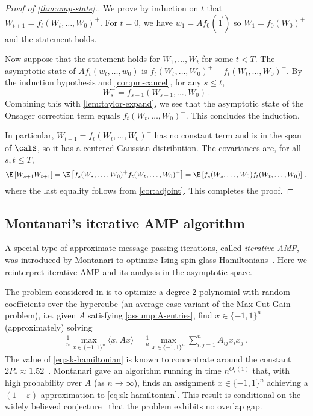 \documentclass[12pt]{article}
\begin{document}
\begin{proof}[Proof of \cref{thm:amp-state}.]
    We prove by induction on $t$ that $W_{t+1}=f_{t}(W_{t},\ldots,W_0)^+$. For $t=0$, we have $w_1 = Af_0(\vec{1})$ so $W_1 = f_0(W_0)^+$ and the statement holds. 
    
    Now suppose that the statement holds for $W_1,\ldots,W_t$ for some $t<T$. The asymptotic state of $A f_t(w_t,\ldots,w_0)$ is $f_t(W_t,\ldots,W_0)^++f_t(W_t,\ldots,W_0)^-$. By the induction hypothesis and \cref{cor:pm-cancel}, for any $s\le t$,
    \[
        W_s^- = f_{s-1}(W_{s-1},\ldots,W_0)\,.
    \]
    Combining this with \cref{lem:taylor-expand}, we see that the asymptotic state of the Onsager correction term equals $f_t(W_t,\ldots,W_0)^-$. This concludes the induction.

    In particular, $W_{t+1}=f_t(W_t,\ldots,W_0)^+$ has no constant term and is in the span of $\calS$, so it has a centered Gaussian distribution. The covariances are, for all $s,t\le T$,
    \[
        \E\left[W_{s+1} W_{t+1}\right] = \E \left[f_s(W_s,\ldots,W_0)^+ f_t(W_t,\ldots,W_0)^+\right] = \E \left[f_s(W_s,\ldots,W_0) f_t(W_t,\ldots,W_0)\right]\,,
    \]
    where the last equality follows from \cref{cor:adjoint}. This completes the proof.
\end{proof}

\subsection{Montanari's iterative AMP algorithm}
\label{sec:montanari}

A special type of approximate message passing
iterations, called {\em iterative AMP},
was introduced by Montanari to
optimize Ising spin glass 
Hamiltonians~\cite{montanari2021optimization, AM20,AMS20:pSpinGlasses}. Here we reinterpret
iterative AMP and its analysis in the
asymptotic space.

The problem considered in \cite{montanari2021optimization} is to
optimize a degree-2 polynomial with random
coefficients over the hypercube (an average-case variant of the Max-Cut-Gain problem), i.e. given
$A$ satisfying \cref{assump:A-entries}, find
$x\in \{-1,1\}^n$ (approximately) solving 
\begin{align}
    \label{eq:sk-hamiltonian}
    \frac 1 n \max_{x\in \{-1,1\}^n}\langle x, Ax\rangle = \frac 1 n \max_{x\in \{-1,1\}^n} \sum_{i,j=1}^n A_{ij} x_i x_j\,.
\end{align}
The value of \cref{eq:sk-hamiltonian} is known to concentrate around the constant $2P_*\approx 1.52$~\cite{Talagrand06,carmona2006universality}.
Montanari gave an algorithm running in time
$n^{O_{\varepsilon}(1)}$ that, with high
probability over $A$ (as $n\to\infty$), finds an assignment
$x\in \{-1,1\}^n$ achieving a $(1-\varepsilon)$-approximation to \cref{eq:sk-hamiltonian}. This result is
conditional on the widely believed conjecture~\cite[Assumption 2]{montanari2021optimization}
that the problem exhibits no overlap gap.
\end{document}
